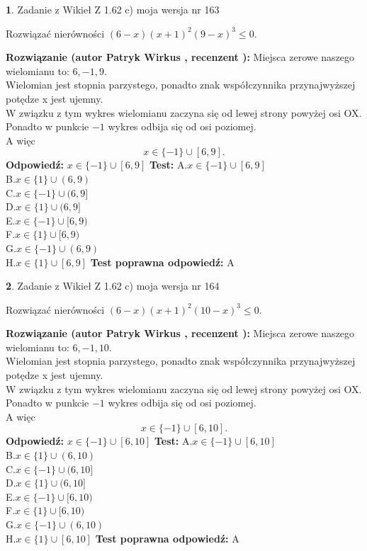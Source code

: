 \documentclass[12pt, a4paper]{article}
\theoremstyle{definition} %
\newtheorem{zad}{}
\newcommand{\zadStart}[1]{\begin{zad}#1\newline}
\newcommand{\zadStop}{\end{zad}}
\newcommand{\rozwStart}[2]{\noindent \textbf{Rozwiązanie (autor #1 , recenzent #2): }\newline}
\newcommand{\rozwStop}{\newline}
\newcommand{\odpStart}{\noindent \textbf{Odpowiedź:}\newline}
\newcommand{\odpStop}{\newline}
\newcommand{\testStart}{\noindent \textbf{Test:}\newline}
\newcommand{\testStop}{\newline}
\newcommand{\kluczStart}{\noindent \textbf{Test poprawna odpowiedź:}\newline}
\newcommand{\kluczStop}{\newline}
\begin{document}
\zadStart{Zadanie z Wikieł Z 1.62 c) moja wersja nr 163}

Rozwiązać nierówności $(6-x)(x+1)^{2}(9-x)^{3}\le0$.
\zadStop
\rozwStart{Patryk Wirkus}{}
Miejsca zerowe naszego wielomianu to: $6, -1, 9$.\\
Wielomian jest stopnia parzystego, ponadto znak współczynnika przy\linebreak najwyższej potędze x jest ujemny.\\ W związku z tym wykres wielomianu zaczyna się od lewej strony powyżej osi OX.\\
Ponadto w punkcie $-1$ wykres odbija się od osi poziomej.\\
A więc $$x \in \{-1\} \cup [6,9].$$
\rozwStop
\odpStart
$x \in \{-1\} \cup [6,9]$
\odpStop
\testStart
A.$x \in \{-1\} \cup [6,9]$\\
B.$x \in \{1\} \cup (6,9)$\\
C.$x \in \{-1\} \cup (6,9]$\\
D.$x \in \{1\} \cup (6,9]$\\
E.$x \in \{-1\} \cup [6,9)$\\
F.$x \in \{1\} \cup [6,9)$\\
G.$x \in \{-1\} \cup (6,9)$\\
H.$x \in \{1\} \cup [6,9]$
\testStop
\kluczStart
A
\kluczStop



\zadStart{Zadanie z Wikieł Z 1.62 c) moja wersja nr 164}

Rozwiązać nierówności $(6-x)(x+1)^{2}(10-x)^{3}\le0$.
\zadStop
\rozwStart{Patryk Wirkus}{}
Miejsca zerowe naszego wielomianu to: $6, -1, 10$.\\
Wielomian jest stopnia parzystego, ponadto znak współczynnika przy\linebreak najwyższej potędze x jest ujemny.\\ W związku z tym wykres wielomianu zaczyna się od lewej strony powyżej osi OX.\\
Ponadto w punkcie $-1$ wykres odbija się od osi poziomej.\\
A więc $$x \in \{-1\} \cup [6,10].$$
\rozwStop
\odpStart
$x \in \{-1\} \cup [6,10]$
\odpStop
\testStart
A.$x \in \{-1\} \cup [6,10]$\\
B.$x \in \{1\} \cup (6,10)$\\
C.$x \in \{-1\} \cup (6,10]$\\
D.$x \in \{1\} \cup (6,10]$\\
E.$x \in \{-1\} \cup [6,10)$\\
F.$x \in \{1\} \cup [6,10)$\\
G.$x \in \{-1\} \cup (6,10)$\\
H.$x \in \{1\} \cup [6,10]$
\testStop
\kluczStart
A
\kluczStop
\end{document}
